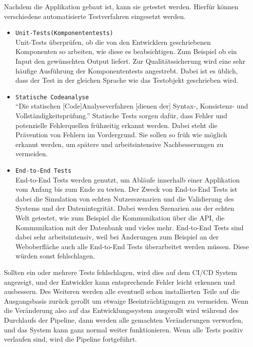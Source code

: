 Nachdem die Applikation gebaut ist, kann sie getestet werden. Hierfür können verschiedene automatisierte Testverfahren eingesetzt werden.
\begin{itemize}
	\item \texttt{Unit-Tests(Komponententests)} \\Unit-Tests überprüfen, ob die von den Entwicklern geschriebenen Komponenten so arbeiten, wie diese es beabsichtigen. Zum Beispiel ob ein Input den gewünschten Output liefert.\autocite[Vgl.][S.21]{Westphal.2012} Zur Qualitätssicherung wird eine sehr häufige Ausführung der Komponententests angestrebt. Dabei ist es üblich, dass der Test in der gleichen Sprache wie das Testobjekt geschrieben wird.
	\item  \texttt{Statische Codeanalyse}\\ \enquote{Die statischen [Code]Analyseverfahren [dienen der] Syntax-, Konsistenz- und Vollständigkeitsprüfung.}\autocite[S.264]{Bommer.2008} Statische Tests sorgen dafür, dass Fehler und potenzielle Fehlerquellen frühzeitig erkannt werden. Dabei steht die Prävention von Fehlern im Vordergrund. Sie sollen so früh wie möglich erkannt werden, um spätere und arbeitsintensive Nachbesserungen zu vermeiden.\autocite[Vgl.][S.263]{Bommer.2008}
	\item  \texttt{End-to-End Tests} \\End-to-End Tests werden genutzt, um Abläufe innerhalb einer Applikation vom Anfang bis zum Ende zu testen. Der Zweck von End-to-End Tests ist dabei die Simulation von echten Nutzerszenarien und die Validierung des Systems und der Datenintegrität.\autocite[Vgl.][S.250]{Bommer.2008} Dabei werden Szenarien aus der echten Welt getestet, wie zum Beispiel die Kommunikation über die API, die Kommunikation mit der Datenbank und vieles mehr. End-to-End Tests sind dabei sehr arbeitsintensiv, weil bei Änderungen zum Beispiel an der Weboberfläche auch alle End-to-End Tests überarbeitet werden müssen. Diese würden sonst fehlschlagen.\autocite[Vgl.][S.252]{Bommer.2008}
\end{itemize}
 Sollten ein oder mehrere Tests fehlschlagen, wird dies auf dem CI/CD System angezeigt, und der Entwickler kann entsprechende Fehler leicht erkennen und ausbessern. Des Weiteren werden alle eventuell schon installierten Teile auf die Ausgangsbasis zurück gerollt um etwaige Beeinträchtigungen zu vermeiden. Wenn die Veränderung also auf das Entwicklungssystem ausgerollt wird während des Durchlaufs der Pipeline, dann werden alle gemachten Veränderungen verworfen, und das System kann ganz normal weiter funktionieren.\autocite[Vgl.][S.41]{Farley.2010} Wenn alle Tests positiv verlaufen sind, wird die Pipeline fortgeführt.\\
